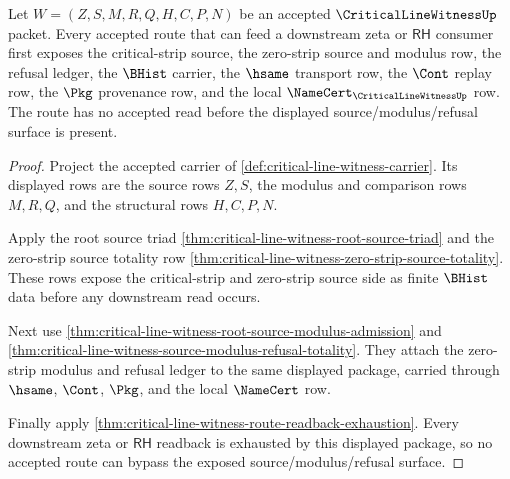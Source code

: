 \begin{theorem}
\label{thm:critical-line-witness-root-route-exposure}
Let $W=(Z,S,M,R,Q,H,C,P,N)$ be an accepted $\CriticalLineWitnessUp$ packet. Every accepted route that can feed a downstream zeta or $\mathsf{RH}$ consumer first exposes the critical-strip source, the zero-strip source and modulus row, the refusal ledger, the $\BHist$ carrier, the $\hsame$ transport row, the $\Cont$ replay row, the $\Pkg$ provenance row, and the local $\NameCert_{\CriticalLineWitnessUp}$ row. The route has no accepted read before the displayed source/modulus/refusal surface is present.
\end{theorem}
\begin{proof}
Project the accepted carrier of \autoref{def:critical-line-witness-carrier}. Its displayed rows are the source rows $Z,S$, the modulus and comparison rows $M,R,Q$, and the structural rows $H,C,P,N$.

Apply the root source triad \autoref{thm:critical-line-witness-root-source-triad} and the zero-strip source totality row \autoref{thm:critical-line-witness-zero-strip-source-totality}. These rows expose the critical-strip and zero-strip source side as finite $\BHist$ data before any downstream read occurs.

Next use \autoref{thm:critical-line-witness-root-source-modulus-admission} and \autoref{thm:critical-line-witness-source-modulus-refusal-totality}. They attach the zero-strip modulus and refusal ledger to the same displayed package, carried through $\hsame$, $\Cont$, $\Pkg$, and the local $\NameCert$ row.

Finally apply \autoref{thm:critical-line-witness-route-readback-exhaustion}. Every downstream zeta or $\mathsf{RH}$ readback is exhausted by this displayed package, so no accepted route can bypass the exposed source/modulus/refusal surface.
\end{proof}

